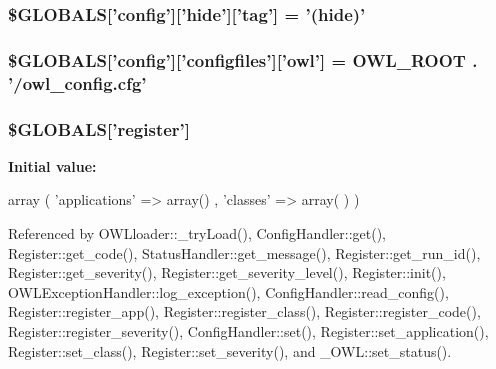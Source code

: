 \subsubsection[{\$GLOBALS}]{\setlength{\rightskip}{0pt plus 5cm}\$GLOBALS\mbox{[}'config'\mbox{]}\mbox{[}'hide'\mbox{]}\mbox{[}'tag'\mbox{]} = '(hide)'}\label{config_8php_a15cc7b8e0baf358db666b97bd9c7fcf5}
\subsubsection[{\$GLOBALS}]{\setlength{\rightskip}{0pt plus 5cm}\$GLOBALS\mbox{[}'config'\mbox{]}\mbox{[}'configfiles'\mbox{]}\mbox{[}'owl'\mbox{]} = {\bf OWL\_\-ROOT} . '/owl\_\-config.cfg'}\label{config_8php_a36e909583250c43d72bdc7c09e2d4a20}
\subsubsection[{\$GLOBALS}]{\setlength{\rightskip}{0pt plus 5cm}\$GLOBALS\mbox{[}'register'\mbox{]}}\label{config_8php_a6cc1ef3a8c20d69988531d27f931855b}
{\bfseries Initial value:}
\begin{DoxyCode}
 array (
                                          'applications'        => array()
                                        , 'classes'                     => array(
      )
                                )
\end{DoxyCode}


Referenced by OWLloader::\_\-tryLoad(), ConfigHandler::get(), Register::get\_\-code(), StatusHandler::get\_\-message(), Register::get\_\-run\_\-id(), Register::get\_\-severity(), Register::get\_\-severity\_\-level(), Register::init(), OWLExceptionHandler::log\_\-exception(), ConfigHandler::read\_\-config(), Register::register\_\-app(), Register::register\_\-class(), Register::register\_\-code(), Register::register\_\-severity(), ConfigHandler::set(), Register::set\_\-application(), Register::set\_\-class(), Register::set\_\-severity(), and \_\-OWL::set\_\-status().

